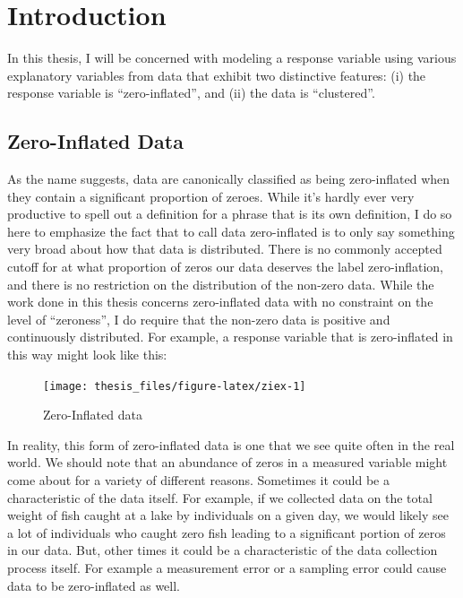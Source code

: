 \documentclass[12pt,twoside]{reedthesis}
\begin{document}
\mainmatter %
\pagestyle{fancyplain} %

\hypertarget{intro-section}{%
\chapter{Introduction}\label{intro-section}}

In this thesis, I will be concerned with modeling a response variable using various explanatory variables from data that exhibit two distinctive features: (i) the response variable is ``zero-inflated'', and (ii) the data is ``clustered''.

\hypertarget{zero-inflated-data}{%
\section{Zero-Inflated Data}\label{zero-inflated-data}}

As the name suggests, data are canonically classified as being zero-inflated when they contain a significant proportion of zeroes. While it's hardly ever very productive to spell out a definition for a phrase that is its own definition, I do so here to emphasize the fact that to call data zero-inflated is to only say something very broad about how that data is distributed. There is no commonly accepted cutoff for at what proportion of zeros our data deserves the label zero-inflation, and there is no restriction on the distribution of the non-zero data. While the work done in this thesis concerns zero-inflated data with no constraint on the level of ``zeroness'', I do require that the non-zero data is positive and continuously distributed. For example, a response variable that is zero-inflated in this way might look like this:
\begin{figure}

{\centering \texttt{[image: thesis\_files/figure-latex/ziex-1]} 

}

\caption{Zero-Inflated data}\label{fig:ziex}
\end{figure}
In reality, this form of zero-inflated data is one that we see quite often in the real world. We should note that an abundance of zeros in a measured variable might come about for a variety of different reasons. Sometimes it could be a characteristic of the data itself. For example, if we collected data on the total weight of fish caught at a lake by individuals on a given day, we would likely see a lot of individuals who caught zero fish leading to a significant portion of zeros in our data. But, other times it could be a characteristic of the data collection process itself. For example a measurement error or a sampling error could cause data to be zero-inflated as well.
\end{document}
